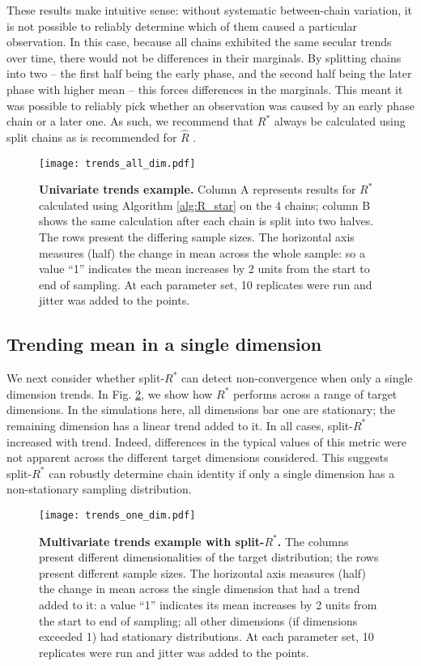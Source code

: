 \documentclass{article}
\begin{document}
These results make intuitive sense: without systematic between-chain variation, it is not possible to reliably determine which of them caused a particular observation. In this case, because all chains exhibited the same secular trends over time, there would not be differences in their marginals. By splitting chains into two -- the first half being the early phase, and the second half being the later phase with higher mean -- this forces differences in the marginals. This meant it was possible to reliably pick whether an observation was caused by an early phase chain or a later one. As such, we recommend that $R^*$ always be calculated using split chains as is recommended for $\widehat{R}$ \citep{carpenter2017stan,vehtari2019rank}.

\begin{figure}[!htb]
	\centerline{\texttt{[image: trends\_all\_dim.pdf]}}
	\caption{\textbf{Univariate trends example.} Column A represents results for $R^*$ calculated using Algorithm \ref{alg:R_star} on the 4 chains; column B  shows the same calculation after each chain is split into two halves. The rows present the differing sample sizes. The horizontal axis measures (half) the change in mean across the whole sample: so a value ``1'' indicates the mean increases by 2 units from the start to end of sampling. At each parameter set, 10 replicates were run and jitter was added to the points.}
	\label{fig:trends_all_dim}
\end{figure}

\subsection{Trending mean in a single dimension}\label{sec:non-stationary_single}
We next consider whether split-$R^*$ can detect non-convergence when only a single dimension trends. In Fig. \ref{fig:trends_one_dim}, we show how $R^*$ performs across a range of target dimensions. In the simulations here, all dimensions bar one are stationary; the remaining dimension has a linear trend added to it. In all cases, split-$R^*$ increased with trend. Indeed, differences in the typical values of this metric were not apparent across the different target dimensions considered. This suggests split-$R^*$ can robustly determine chain identity if only a single dimension has a non-stationary sampling distribution.


\begin{figure}[!htb]
	\centerline{\texttt{[image: trends\_one\_dim.pdf]}}
	\caption{\textbf{Multivariate trends example with split-$R^*$.} The columns present different dimensionalities of the target distribution; the rows present different sample sizes. The horizontal axis measures (half) the change in mean across the single dimension that had a trend added to it: a value ``1'' indicates its mean increases by 2 units from the start to end of sampling; all other dimensions (if dimensions exceeded 1) had stationary distributions. At each parameter set, 10 replicates were run and jitter was added to the points.}
	\label{fig:trends_one_dim}
\end{figure}
\end{document}
